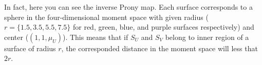 In fact, here you can see the inverse Prony map. Each surface corresponds to a sphere in the four-dimensional moment space with given radius ($r=\{1.5, 3.5, 5.5, 7.5\}$ for red, green, blue, and purple surfaces respectively) and center ($(1, 1, \mu_U)$). This means that if $S_U$ and $S_V$ belong to inner region of a surface of radius $r$, the corresponded distance in the moment space will less that $2r$.
  
